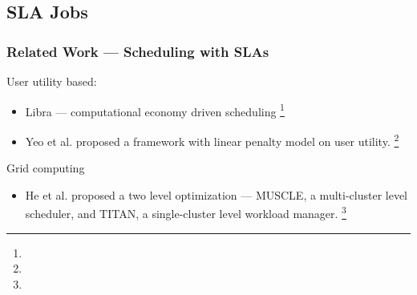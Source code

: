 \subsection{SLA Jobs}
\begin{frame}
  \frametitle{Related Work --- Scheduling with SLAs}
  User utility based:
  \begin{itemize}
    \item Libra --- computational economy driven scheduling
      \footnote[frame]{\tiny{}}
    \item Yeo et al. proposed a framework with linear penalty model on
      user utility.
      \footnote[frame]{\tiny{}}
  \end{itemize}
  Grid computing
  \begin{itemize}
    \item He et al. proposed a two level optimization --- MUSCLE, a
      multi-cluster level scheduler, and TITAN, a single-cluster level
      workload manager.
      \footnote[frame]{\tiny{}}
  \end{itemize}
\end{frame}
